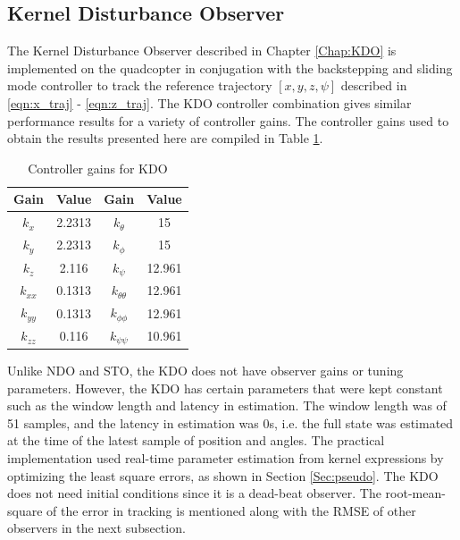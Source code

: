 \documentclass[letterpaper%
, twoside%
, 12pt%
,memoire%
, english%
,creativecommons,hyperref%
]{thETS}
\theoremstyle{newThmStyle}
\begin{document}
\FloatBarrier
\subsection{Kernel Disturbance Observer}
The Kernel Disturbance Observer described in Chapter \ref{Chap:KDO} is implemented on the quadcopter in conjugation with the backstepping and sliding mode controller to track the reference trajectory $[x,y,z,\psi]$ described in \eqref{eqn:x_traj} - \eqref{eqn:z_traj}. The KDO controller combination gives similar performance results for a variety of controller gains. The controller gains used to obtain the results presented here are compiled in Table \ref{Tab:realControllerGainsKDO}.

\begin{table}
\parbox{0.65\textwidth}{\caption{Controller gains for KDO}\label{Tab:realControllerGainsKDO}} 
\begin{tabular}{|c|c|c|c|}
\hline
{\bf Gain} & {\bf Value} & {\bf Gain}         & {\bf Value}  \\ \hline
$k_x$      & 2.2313      & $k_\theta$         & 15           \\ \hline
$k_y$      & 2.2313      & $k_\phi$           & 15           \\ \hline
$k_z$      & 2.116       & $k_\psi$           & 12.961       \\ \hline 
$k_{xx}$   & 0.1313      & $k_{\theta\theta}$ & 12.961       \\ \hline
$k_{yy}$   & 0.1313      & $k_{\phi\phi}$     & 12.961       \\ \hline
$k_{zz}$   & 0.116       & $k_{\psi\psi}$     & 10.961       \\ \hline 
\end{tabular}
\end{table}

Unlike NDO and STO, the KDO does not have observer gains or tuning parameters. However, the KDO has certain parameters that were kept constant such as the window length and latency in estimation. The window length was of 51 samples, and the latency in estimation was 0s, i.e. the full state was estimated at the time of the latest sample of position and angles. The practical implementation used real-time parameter estimation from kernel expressions by optimizing the least square errors, as shown in Section \ref{Sec:pseudo}. The KDO does not need initial conditions since it is a dead-beat observer. The root-mean-square of the error in tracking is mentioned along with the RMSE of other observers in the next subsection.
\end{document}
